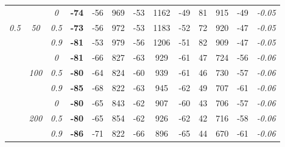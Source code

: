 \begin{table}
\begin{center}
\begin{tabular}{ccc|cc|cc|cc|cc|c|c}
\cline{2-3}\rule{0pt}{3ex}
& & \it  0  & {\bf -74} & -56 & 969 & -53 & 1162 & -49 & 81 & 915 & -49 & \it  -0.05 \\
\it  0.5  & \it  50  & \it  0.5  & {\bf -73} & -56 & 972 & -53 & 1183 & -52 & 72 & 920 & -47 & \it  -0.05 \\
& & \it  0.9  & {\bf -81} & -53 & 979 & -56 & 1206 & -51 & 82 & 909 & -47 & \it  -0.05 \\[1ex]
\cline{2-3}\rule{0pt}{3ex}
& & \it  0  & {\bf -81} & -66 & 827 & -63 & 929 & -61 & 47 & 724 & -56 & \it  -0.06 \\
 & \it  100  & \it  0.5  & {\bf -80} & -64 & 824 & -60 & 939 & -61 & 46 & 730 & -57 & \it  -0.06 \\
& & \it  0.9  & {\bf -85} & -68 & 822 & -63 & 945 & -62 & 49 & 707 & -61 & \it  -0.06 \\[1ex]
\cline{2-3}\rule{0pt}{3ex}
& & \it  0  & {\bf -80} & -65 & 843 & -62 & 907 & -60 & 43 & 706 & -57 & \it  -0.06 \\
 & \it  200  & \it  0.5  & {\bf -80} & -65 & 854 & -62 & 926 & -62 & 42 & 716 & -58 & \it  -0.06 \\
& & \it  0.9  & {\bf -86} & -71 & 822 & -66 & 896 & -65 & 44 & 670 & -61 & \it  -0.06 \\
\hline\end{tabular}
\end{center}
\end{table}




